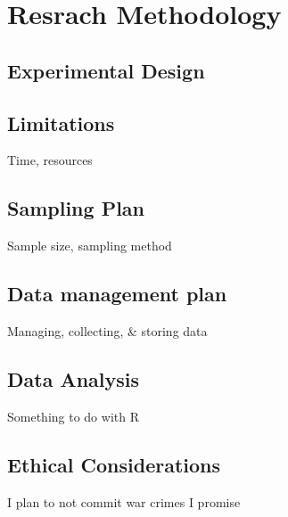 \section{Resrach Methodology}

\subsection{Experimental Design}

\subsection{Limitations}

Time, resources

\subsection{Sampling Plan}

Sample size, sampling method

\subsection{Data management plan}

Managing, collecting, \& storing data

\subsection{Data Analysis}

Something to do with R

\subsection{Ethical Considerations}

I plan to not commit war crimes I promise
